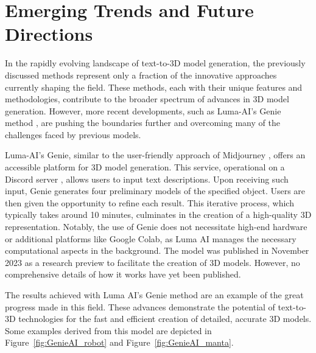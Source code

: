 \section{Emerging Trends and Future Directions}

In the rapidly evolving landscape of text-to-3D model generation, the previously discussed methods represent only a fraction of the innovative approaches currently shaping the field. These methods, each with their unique features and methodologies, contribute to the broader spectrum of advances in 3D model generation. However, more recent developments, such as Luma-AI's Genie method \citep{LumaAIGenie2023}, are pushing the boundaries further and overcoming many of the challenges faced by previous models.

Luma-AI's Genie, similar to the user-friendly approach of Midjourney \citep{Midjourney2023}, offers an accessible platform for 3D model generation. This service, operational on a Discord server \citep{discord}, allows users to input text descriptions. Upon receiving such input, Genie generates four preliminary models of the specified object. Users are then given the opportunity to refine each result. This iterative process, which typically takes around 10 minutes, culminates in the creation of a high-quality 3D representation. Notably, the use of Genie does not necessitate high-end hardware or additional platforms like Google Colab, as Luma AI manages the necessary computational aspects in the background. The model was published in November 2023 as a research preview to facilitate the creation of 3D models. However, no comprehensive details of how it works have yet been published.

The results achieved with Luma AI's Genie method are an example of the great progress made in this field. These advances demonstrate the potential of text-to-3D technologies for the fast and efficient creation of detailed, accurate 3D models. Some examples derived from this model are depicted in Figure~\ref{fig:GenieAI_robot} and Figure~\ref{fig:GenieAI_manta}. 

